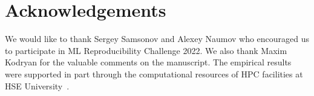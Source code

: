 \section*{Acknowledgements}

We would like to thank Sergey Samsonov and Alexey Naumov who encouraged us to participate in ML Reproducibility Challenge 2022. We also thank Maxim Kodryan for the valuable comments on the manuscript. The empirical results were supported in part through the computational resources of HPC facilities at HSE University~\cite{hpc}.
